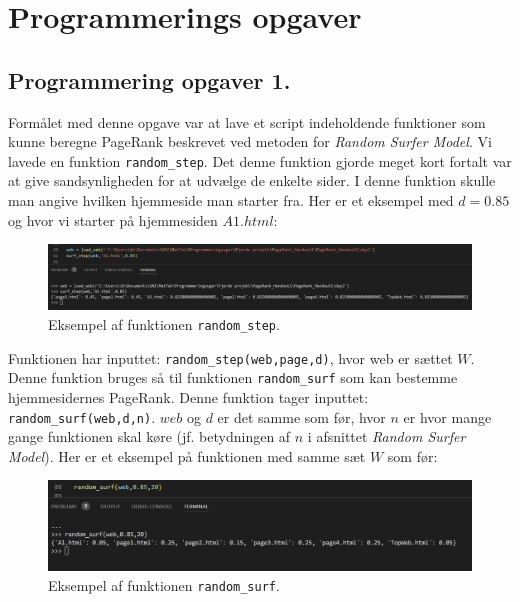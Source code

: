 \section{Programmerings opgaver}



\subsection{Programmering opgaver 1.}

Formålet med denne opgave var at lave et script indeholdende funktioner som kunne beregne PageRank beskrevet ved metoden for \emph{Random Surfer Model}. Vi lavede en funktion \texttt{random\_step}. Det denne funktion gjorde meget kort fortalt var at give sandsynligheden for at udvælge de enkelte sider. I denne funktion skulle man angive hvilken hjemmeside man starter fra. Her er et eksempel med $d = 0.85$ og hvor vi starter på hjemmesiden $A1.html$:
\begin{figure}[!h]
    \centering
    \includegraphics[width = \linewidth]{Billeder/surf_step_test.png}
    \caption{Eksempel af funktionen \texttt{random\_step}.}
    \label{fig:my_label}
\end{figure}

Funktionen har inputtet: \texttt{random\_step(web,page,d)}, hvor web er sættet $W$. Denne funktion bruges så til funktionen \texttt{random\_surf} som kan bestemme hjemmesidernes PageRank. Denne funktion tager inputtet: \texttt{random\_surf(web,d,n)}. $web$ og $d$ er det samme som før, hvor $n$ er hvor mange gange funktionen skal køre (jf. betydningen af $n$ i afsnittet \emph{Random Surfer Model}). Her er et eksempel på funktionen med samme sæt $W$ som før:
\begin{figure}[!h]
    \centering
    \includegraphics[width = \linewidth]{Billeder/random_surf_test.png}
    \caption{Eksempel af funktionen \texttt{random\_surf}.}
    \label{fig:my_label}
\end{figure}

